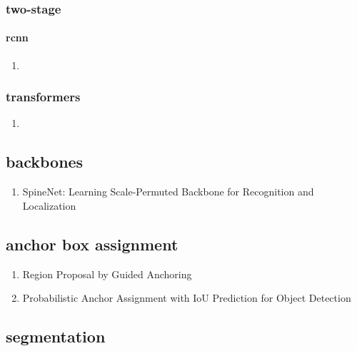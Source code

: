 \documentclass[acmlarge]{acmart}
\begin{document}
		\subsubsection{two-stage}
			\paragraph{rcnn}
			\begin{enumerate}
				\item
			\end{enumerate}
		\begin{enumerate}
		\end{enumerate}
		\subsubsection{transformers}
		\begin{enumerate}
			\item
		\end{enumerate}
	\begin{enumerate}
	\end{enumerate}
	\subsection{backbones}
	\begin{enumerate}
		\item SpineNet: Learning Scale-Permuted Backbone for Recognition and Localization \cite{Du2020SpineNetLS} 

	\end{enumerate}
	\subsection{anchor box assignment}
	\begin{enumerate}
		\item Region Proposal by Guided Anchoring \cite{Wang2019RegionPB} 

		\item Probabilistic Anchor Assignment with IoU Prediction for Object Detection \cite{Kim2020ProbabilisticAA} 

	\end{enumerate}
	\subsection{segmentation}
\end{document}
